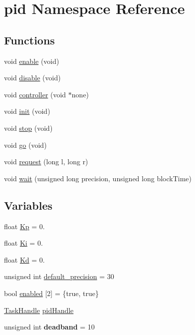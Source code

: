 \hypertarget{namespacepid}{}\section{pid Namespace Reference}
\label{namespacepid}
\subsection*{Functions}
\begin{DoxyCompactItemize}
\item 
void \hyperlink{namespacepid_a4a4e5d1d2391a4ce24308442c4d69723}{enable} (void)
\item 
void \hyperlink{namespacepid_aba928d2e1b704af6cf1e652224411be5}{disable} (void)
\item 
void \hyperlink{namespacepid_ab65dc5974d66ecc9406878a375244f20}{controller} (void $\ast$none)
\item 
void \hyperlink{namespacepid_aa59662d2f69d5a905a28f2ca9bc6bdcb}{init} (void)
\item 
void \hyperlink{namespacepid_a702bbb1d722eedebf32c55c89ff8afd6}{stop} (void)
\item 
void \hyperlink{namespacepid_a3a4e4a51df909f0aa3b2df01d35ff75b}{go} (void)
\item 
void \hyperlink{namespacepid_a8a2a0422275eb1a3310411a7eccda378}{request} (long l, long r)
\item 
void \hyperlink{namespacepid_ae415ddecc97484b1195e22a89b429506}{wait} (unsigned long precision, unsigned long block\+Time)
\end{DoxyCompactItemize}
\subsection*{Variables}
\begin{DoxyCompactItemize}
\item 
float \hyperlink{namespacepid_ad77953fe15d091ff43f7bd3ddd2402b0}{Kp} = 0.
\item 
float \hyperlink{namespacepid_ac63d639f53e93763cbf9f54838a3e325}{Ki} = 0.
\item 
float \hyperlink{namespacepid_ab6d926f5578bc84849cd8306b32a7481}{Kd} = 0.
\item 
unsigned int \hyperlink{namespacepid_ab7ebcf570abd665235d5edd4e78c1d2a}{default\+\_\+precision} = 30
\item 
bool \hyperlink{namespacepid_a210c97219b84549120ef7b0a27d75971}{enabled} \mbox{[}2\mbox{]} = \{true, true\}
\item 
\hyperlink{API_8h_a23dca3c0de10682afb982677ff292f77}{Task\+Handle} \hyperlink{namespacepid_a14ac02223a13e370357cc0c8ded9864d}{pid\+Handle}
\item 
\mbox{\label{namespacepid_aa179832793655bda657144efab78d58a}} 
unsigned int {\bfseries deadband} = 10
\end{DoxyCompactItemize}


